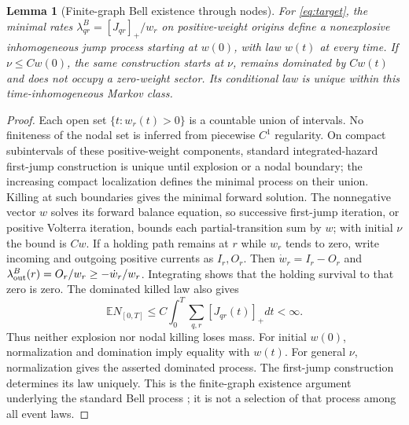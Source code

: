 \documentclass[11pt]{article}
\newtheorem{lemma}[theorem]{Lemma}
\theoremstyle{definition}\newtheorem{definition}[theorem]{Definition}
\theoremstyle{remark}\newtheorem{remark}[theorem]{Remark}
\begin{document}
\begin{lemma}[Finite-graph Bell existence through nodes]\label{kin:existence}
For \eqref{eq:target}, the minimal rates
$\lambda^B_{qr}=[J_{qr}]_+/w_r$ on positive-weight origins define a
nonexplosive inhomogeneous jump process starting at $w(0)$, with law
$w(t)$ at every time. If $\nu\le Cw(0)$, the same construction starts at
$\nu$, remains dominated by $Cw(t)$ and does not occupy a zero-weight
sector. Its conditional law is unique within this time-inhomogeneous
Markov class.
\end{lemma}
\begin{proof}
Each open set $\{t:w_r(t)>0\}$ is a countable union of intervals.
No finiteness of the nodal set is inferred from piecewise $C^1$ regularity.
On compact subintervals of these positive-weight components, standard
integrated-hazard first-jump construction is unique until explosion or a
nodal boundary; the increasing compact localization defines the minimal
process on their union. Killing at
such boundaries gives the minimal forward solution. The nonnegative
vector $w$ solves its forward balance equation, so successive first-jump
iteration, or positive Volterra iteration, bounds each partial-transition
sum by $w$; with initial $\nu$ the bound is $Cw$.
If a holding path remains at $r$ while $w_r$ tends to zero, write incoming
and outgoing positive currents as $I_r,O_r$. Then
$\dot w_r=I_r-O_r$ and
$\lambda^B_{\rm out}(r)=O_r/w_r\ge-\dot w_r/w_r$.
Integrating shows that the holding survival to that zero is zero.
The dominated killed law also gives
\[
 \mathbb E N_{[0,T]}\le
 C\int_0^T\sum_{q,r}[J_{qr}(t)]_+dt<\infty.
\]
Thus neither explosion nor nodal killing loses mass. For initial $w(0)$,
normalization and domination imply equality with $w(t)$. For general
$\nu$, normalization gives the asserted dominated process. The
first-jump construction determines its law uniquely. This is the
finite-graph existence argument underlying the standard Bell process
\cite{Bell2005}; it is not a selection of that process among all event laws.
\end{proof}
\end{document}
